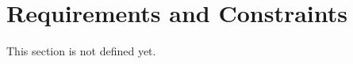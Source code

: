 \chapter{Requirements and Constraints}
\label{Requirements_and_constraints}

This section is not defined yet. 